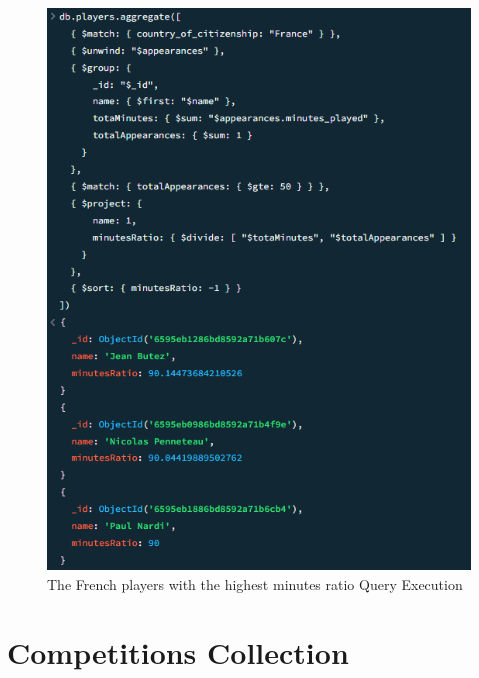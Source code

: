 \documentclass{Configuration_Files/PoliMi3i_thesis}
\begin{document}
\begin{figure}[htbp]
    \centering
    \includegraphics[scale=0.65]{Images/Queries/French_minutes_ratio/fmr.png}
    \caption{The French players with the highest minutes ratio Query Execution}
\end{figure}
\newpage
\section{Competitions Collection }
\end{document}

